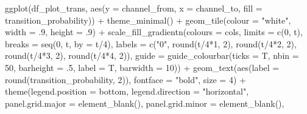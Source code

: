 \documentclass[
]{book}
\newenvironment{Shaded}{\begin{snugshade}}{\end{snugshade}}
\newcommand{\AttributeTok}[1]{\textcolor[rgb]{0.77,0.63,0.00}{#1}}
\newcommand{\DecValTok}[1]{\textcolor[rgb]{0.00,0.00,0.81}{#1}}
\newcommand{\FunctionTok}[1]{\textcolor[rgb]{0.00,0.00,0.00}{#1}}
\newcommand{\NormalTok}[1]{#1}
\newcommand{\SpecialCharTok}[1]{\textcolor[rgb]{0.00,0.00,0.00}{#1}}
\newcommand{\StringTok}[1]{\textcolor[rgb]{0.31,0.60,0.02}{#1}}
\begin{document}
\begin{Shaded}
\begin{Highlighting}[]
\FunctionTok{ggplot}\NormalTok{(df\_plot\_trans, }\FunctionTok{aes}\NormalTok{(}\AttributeTok{y =}\NormalTok{ channel\_from, }\AttributeTok{x =}\NormalTok{ channel\_to, }\AttributeTok{fill =}\NormalTok{ transition\_probability)) }\SpecialCharTok{+}
        \FunctionTok{theme\_minimal}\NormalTok{() }\SpecialCharTok{+}
        \FunctionTok{geom\_tile}\NormalTok{(}\AttributeTok{colour =} \StringTok{"white"}\NormalTok{, }\AttributeTok{width =}\NormalTok{ .}\DecValTok{9}\NormalTok{, }\AttributeTok{height =}\NormalTok{ .}\DecValTok{9}\NormalTok{) }\SpecialCharTok{+}
        \FunctionTok{scale\_fill\_gradientn}\NormalTok{(}\AttributeTok{colours =}\NormalTok{ cols, }\AttributeTok{limits =} \FunctionTok{c}\NormalTok{(}\DecValTok{0}\NormalTok{, t),}
                             \AttributeTok{breaks =} \FunctionTok{seq}\NormalTok{(}\DecValTok{0}\NormalTok{, t, }\AttributeTok{by =}\NormalTok{ t}\SpecialCharTok{/}\DecValTok{4}\NormalTok{),}
                             \AttributeTok{labels =} \FunctionTok{c}\NormalTok{(}\StringTok{"0"}\NormalTok{, }\FunctionTok{round}\NormalTok{(t}\SpecialCharTok{/}\DecValTok{4}\SpecialCharTok{*}\DecValTok{1}\NormalTok{, }\DecValTok{2}\NormalTok{), }\FunctionTok{round}\NormalTok{(t}\SpecialCharTok{/}\DecValTok{4}\SpecialCharTok{*}\DecValTok{2}\NormalTok{, }\DecValTok{2}\NormalTok{), }\FunctionTok{round}\NormalTok{(t}\SpecialCharTok{/}\DecValTok{4}\SpecialCharTok{*}\DecValTok{3}\NormalTok{, }\DecValTok{2}\NormalTok{), }\FunctionTok{round}\NormalTok{(t}\SpecialCharTok{/}\DecValTok{4}\SpecialCharTok{*}\DecValTok{4}\NormalTok{, }\DecValTok{2}\NormalTok{)),}
                             \AttributeTok{guide =} \FunctionTok{guide\_colourbar}\NormalTok{(}\AttributeTok{ticks =}\NormalTok{ T, }\AttributeTok{nbin =} \DecValTok{50}\NormalTok{, }\AttributeTok{barheight =}\NormalTok{ .}\DecValTok{5}\NormalTok{, }\AttributeTok{label =}\NormalTok{ T, }\AttributeTok{barwidth =} \DecValTok{10}\NormalTok{)) }\SpecialCharTok{+}
        \FunctionTok{geom\_text}\NormalTok{(}\FunctionTok{aes}\NormalTok{(}\AttributeTok{label =} \FunctionTok{round}\NormalTok{(transition\_probability, }\DecValTok{2}\NormalTok{)), }\AttributeTok{fontface =} \StringTok{"bold"}\NormalTok{, }\AttributeTok{size =} \DecValTok{4}\NormalTok{) }\SpecialCharTok{+}
        \FunctionTok{theme}\NormalTok{(}\AttributeTok{legend.position =} \StringTok{\textquotesingle{}bottom\textquotesingle{}}\NormalTok{,}
              \AttributeTok{legend.direction =} \StringTok{"horizontal"}\NormalTok{,}
              \AttributeTok{panel.grid.major =} \FunctionTok{element\_blank}\NormalTok{(),}
              \AttributeTok{panel.grid.minor =} \FunctionTok{element\_blank}\NormalTok{(),}

\end{Highlighting}
\end{Shaded}
\end{document}
